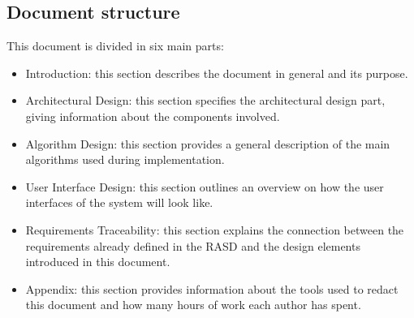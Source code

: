 \documentclass[18pt,oneside,a4paper, titlepage]{article}
\begin{document}
	\subsection{Document structure}
		This document is divided in six main parts:
		\begin{itemize}
			\item Introduction: this section describes the document in general and its purpose.
			\item Architectural Design: this section specifies the architectural design part, giving information about the components involved.
			\item Algorithm Design: this section provides a general description of the main algorithms used during implementation.
			\item User Interface Design: this section outlines an overview on how the user interfaces of the system will look like. 
			\item Requirements Traceability: this section explains the connection between the requirements already defined in the RASD and the design elements introduced in this document.
			\item Appendix: this section provides information about the tools used to redact this document and how many hours of work each author has spent. 
		\end{itemize}
\end{document}
